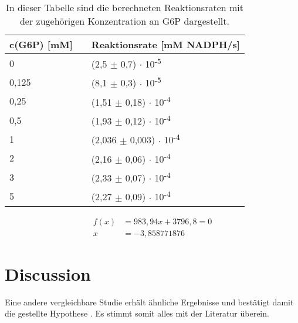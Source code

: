 \documentclass[a4paper,12pt]{report}
\begin{document}
\begin{table}[h!]
	\centering
	\caption [Reaktionsraten]{In dieser Tabelle sind die berechneten Reaktionsraten mit der zugehörigen Konzentration an G6P dargestellt.\label{TabelleReaktionsraten}}
	
	\begin{tabular}{lp{1.5cm}l}
		\toprule
		c(G6P) [mM]	& &	Reaktionsrate [mM NADPH/s]	\\
		
		\midrule
		0	& &	(2,5 $\pm$ 0,7) $\cdot$ 10\textsuperscript{-5}	\\
		0,125	& &	(8,1 $\pm$ 0,3) $\cdot$ 10\textsuperscript{-5}	\\
		0,25	& &	(1,51 $\pm$ 0,18) $\cdot$ 10\textsuperscript{-4}	\\
		0,5	& &	(1,93 $\pm$ 0,12) $\cdot$ 10\textsuperscript{-4}	\\
		1	& &	(2,036 $\pm$ 0,003) $\cdot$ 10\textsuperscript{-4}	\\
		2	& &	(2,16 $\pm$ 0,06) $\cdot$ 10\textsuperscript{-4}	\\
		3	& &	(2,33 $\pm$ 0,07) $\cdot$ 10\textsuperscript{-4}	\\
		5	& &	(2,27 $\pm$ 0,09) $\cdot$ 10\textsuperscript{-4}	\\
		
		\bottomrule
	\end{tabular}
\end{table}


\FloatBarrier
		
\begin{align*}
f(x) &= 983,94x + 3796,8 = 0 \\
x &= -3,858771876
\end{align*}


\chapter{Discussion}

Eine andere vergleichbare Studie erhält ähnliche Ergebnisse und bestätigt damit die gestellte Hypothese \cite{douglas1900}. Es stimmt somit alles mit der Literatur überein. 

\appendix
\setcounter{chapter}{18}




\printbibliography
\end{document}
